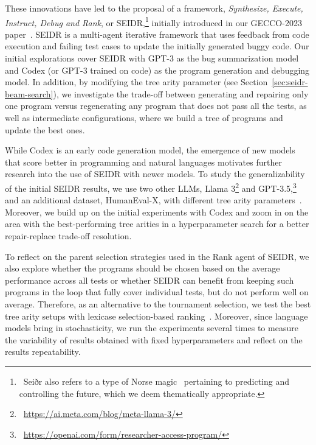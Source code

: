 These innovations have led to the proposal of a framework, \emph{Synthesize, Execute, Instruct, Debug and Rank}, or SEIDR,\footnote{~Seiðr also refers to a type of Norse magic~\cite{blain2002:nine} pertaining to predicting and controlling the future, which we deem thematically appropriate.} initially introduced in our GECCO-2023 paper~\cite{liventsevFullyAutonomousProgramming2023}. 
SEIDR is a multi-agent iterative framework that uses feedback from code execution and failing test cases to update the initially generated buggy code. 
Our initial explorations cover SEIDR with GPT-3 as the bug summarization model and Codex (or GPT-3 trained on code) as the program generation and debugging model.  
In addition, by modifying the tree arity parameter (see Section~\ref{sec:seidr-beam-search}), we investigate the trade-off between generating and repairing only one program versus regenerating any program that does not pass all the tests, as well as intermediate configurations, where we build a tree of programs and update the best ones.

While Codex is an early code generation model, the emergence of new models that score better in programming and natural languages motivates further research into the use of SEIDR with newer models. 
To study the generalizability of the initial SEIDR results, we use two other LLMs, Llama 3\footnote{~\url{https://ai.meta.com/blog/meta-llama-3/}} and GPT-3.5,\footnote{~\url{https://openai.com/form/researcher-access-program/}} and an additional dataset, HumanEval-X, with different tree arity parameters~\cite{brown2020:language,chenEvaluatingLargeLanguage2021,zheng2023:codegeex}. 
Moreover, we build up on the initial experiments with Codex and zoom in on the area with the best-performing tree arities in a hyperparameter search for a better repair-replace trade-off resolution. 

To reflect on the parent selection strategies used in the Rank agent of SEIDR, we also explore whether the programs should be chosen based on the average performance across all tests or whether SEIDR can benefit from keeping such programs in the loop that fully cover individual tests, but do not perform well on average.
Therefore, as an alternative to the tournament selection, we test the best tree arity setups with lexicase selection-based ranking~\cite{helmuth2015:solving}.
Moreover, since language models bring in stochasticity, we run the experiments several times to measure the variability of results obtained with fixed hyperparameters and reflect on the results repeatability.

